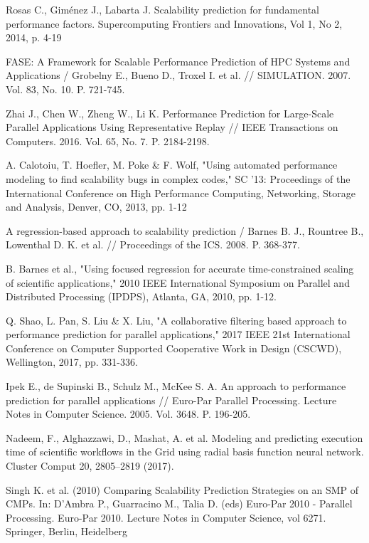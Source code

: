 \begin{thebibliography}{00}

	Rosas C., Giménez J., Labarta J. Scalability prediction for fundamental
	performance factors. Supercomputing Frontiers and Innovations, Vol 1, No 2,
	2014, p. 4-19

	FASE: A Framework for Scalable Performance Prediction of HPC Systems and Applications
	/ Grobelny E., Bueno D., Troxel I. et al. // SIMULATION. 2007. Vol. 83, No. 10. P. 721-745.

	Zhai J., Chen W., Zheng W., Li K. Performance Prediction for Large-Scale Parallel
	Applications Using Representative Replay // IEEE Transactions on Computers. 2016. Vol. 65,
	No. 7. P. 2184-2198.

	A. Calotoiu, T. Hoefler, M. Poke \& F. Wolf, "Using automated performance modeling
	to find scalability bugs in complex codes," SC '13: Proceedings of the International
	Conference on High Performance Computing, Networking, Storage and Analysis, Denver,
	CO, 2013, pp. 1-12

	A regression-based approach to scalability prediction / Barnes B. J., Rountree B., Lowenthal
	D. K. et al. // Proceedings of the ICS. 2008. P. 368-377.

	B. Barnes et al., "Using focused regression for accurate time-constrained scaling of scientific applications," 2010 IEEE International Symposium on Parallel and Distributed Processing (IPDPS), Atlanta, GA, 2010, pp. 1-12.

	Q. Shao, L. Pan, S. Liu \& X. Liu, "A collaborative filtering based approach to performance prediction for parallel applications," 2017 IEEE 21st International Conference on Computer Supported Cooperative Work in Design (CSCWD), Wellington, 2017, pp. 331-336.

	Ipek E., de Supinski B., Schulz M., McKee S. A. An approach to performance prediction for parallel applications // Euro-Par Parallel Processing. Lecture Notes in Computer Science. 2005. Vol. 3648. P. 196-205.

	Nadeem, F., Alghazzawi, D., Mashat, A. et al. Modeling and predicting execution time of scientific workflows in the Grid using radial basis function neural network. Cluster Comput 20, 2805–2819 (2017).

	Singh K. et al. (2010) Comparing Scalability Prediction Strategies on an SMP of CMPs. In: D’Ambra P., Guarracino M., Talia D. (eds) Euro-Par 2010 - Parallel Processing. Euro-Par 2010. Lecture Notes in Computer Science, vol 6271. Springer, Berlin, Heidelberg


\end{thebibliography}
